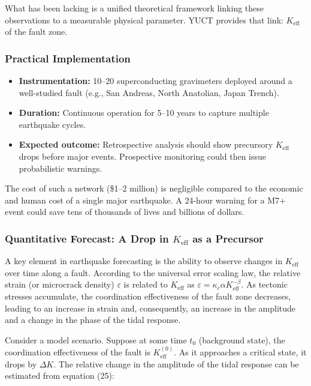 \documentclass[12pt,a4paper]{article}
\theoremstyle{remark}
\begin{document}
	What has been lacking is a unified theoretical framework linking these observations to a measurable physical parameter. YUCT provides that link: \(K_{\mathrm{eff}}\) of the fault zone.
	
	\subsubsection{Practical Implementation}
	
	\begin{itemize}
		\item \textbf{Instrumentation:} 10–20 superconducting gravimeters deployed around a well-studied fault (e.g., San Andreas, North Anatolian, Japan Trench).
		\item \textbf{Duration:} Continuous operation for 5–10 years to capture multiple earthquake cycles.
		\item \textbf{Expected outcome:} Retrospective analysis should show precursory \(K_{\mathrm{eff}}\) drops before major events. Prospective monitoring could then issue probabilistic warnings.
	\end{itemize}
	
	The cost of such a network (\$1–2 million) is negligible compared to the economic and human cost of a single major earthquake. A 24-hour warning for a M7+ event could save tens of thousands of lives and billions of dollars.
	
	\subsubsection{Quantitative Forecast: A Drop in \(K_{\mathrm{eff}}\) as a Precursor}
	\label{subsubsec:precursor}
	
	A key element in earthquake forecasting is the ability to observe changes in \(K_{\mathrm{eff}}\) over time along a fault. According to the universal error scaling law, the relative strain (or microcrack density) \(\varepsilon\) is related to \(K_{\mathrm{eff}}\) as \(\varepsilon = \kappa_c \alpha K_{\mathrm{eff}}^{-\beta}\). As tectonic stresses accumulate, the coordination effectiveness of the fault zone decreases, leading to an increase in strain and, consequently, an increase in the amplitude and a change in the phase of the tidal response.
	
	Consider a model scenario. Suppose at some time \(t_0\) (background state), the coordination effectiveness of the fault is \(K_{\mathrm{eff}}^{(0)}\). As it approaches a critical state, it drops by \(\Delta K\). The relative change in the amplitude of the tidal response can be estimated from equation (25):
	
\end{document}
